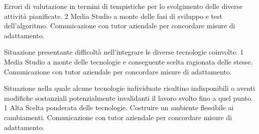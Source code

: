 {Errori di valutazione in termini di tempistiche per lo svolgimento delle diverse attività pianificate.}
{2}
{Media}
{Studio a monte delle fasi di sviluppo e test dell'algoritmo.}
{Comunicazione con tutor aziendale per concordare misure di adattamento.}

{Situazione presentante difficoltà nell’integrare le diverse tecnologie coinvolte.}
{1}
{Media}
{Studio a monte delle tecnologie e conseguente scelta ragionata delle stesse.}
{Comunicazione con tutor aziendale per concordare misure di adattamento.}

{Situazione nella quale alcune tecnologie individuate risultino indisponibili o aventi modifiche sostanziali potenzialmente invalidanti il lavoro svolto fino a quel punto.}
{1}
{Alta}
{Scelta ponderata delle tecnologie. Costruire un ambiente flessibile ai cambiamenti.}
{Comunicazione con tutor aziendale per concordare misure di adattamento.}
